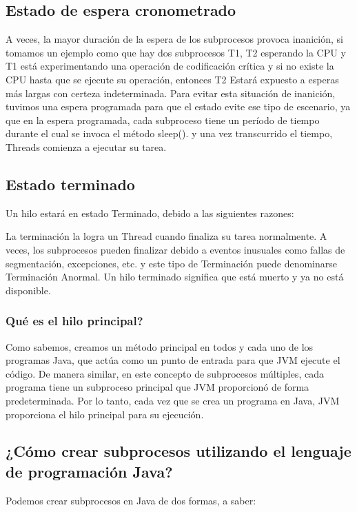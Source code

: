 \documentclass{article}
\begin{document}
\subsection{Estado de espera cronometrado}

A veces, la mayor duración de la espera de los subprocesos provoca inanición, si tomamos un ejemplo como que hay dos subprocesos T1, T2 esperando la CPU y T1 está experimentando una operación de codificación crítica y si no existe la CPU hasta que se ejecute su operación, entonces T2 Estará expuesto a esperas más largas con certeza indeterminada. Para evitar esta situación de inanición, tuvimos una espera programada para que el estado evite ese tipo de escenario, ya que en la espera programada, cada subproceso tiene un período de tiempo durante el cual se invoca el método sleep(). y una vez transcurrido el tiempo, Threads comienza a ejecutar su tarea.

\subsection{Estado terminado}

Un hilo estará en estado Terminado, debido a las siguientes razones:

La terminación la logra un Thread cuando finaliza su tarea normalmente.
A veces, los subprocesos pueden finalizar debido a eventos inusuales como fallas de segmentación, excepciones, etc. y este tipo de Terminación puede denominarse Terminación Anormal.
Un hilo terminado significa que está muerto y ya no está disponible.

\subsubsection{Qué es el hilo principal?}

Como sabemos, creamos un método principal en todos y cada uno de los programas Java, que actúa como un punto de entrada para que JVM ejecute el código. De manera similar, en este concepto de subprocesos múltiples, cada programa tiene un subproceso principal que JVM proporcionó de forma predeterminada. Por lo tanto, cada vez que se crea un programa en Java, JVM proporciona el hilo principal para su ejecución.

\subsection{¿Cómo crear subprocesos utilizando el lenguaje de programación Java?}
Podemos crear subprocesos en Java de dos formas, a saber:
\end{document}
